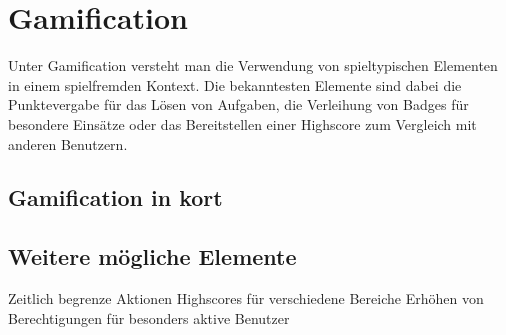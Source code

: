 \chapter{Gamification}
\label{gamification}

Unter Gamification versteht man die Verwendung von spieltypischen Elementen in einem spielfremden Kontext.
Die bekanntesten Elemente sind dabei die Punktevergabe für das Lösen von Aufgaben, die Verleihung von Badges für besondere Einsätze oder das Bereitstellen einer Highscore zum Vergleich mit anderen Benutzern.

\section{Gamification in kort}


\section{Weitere mögliche Elemente}

Zeitlich begrenze Aktionen
Highscores für verschiedene Bereiche
Erhöhen von Berechtigungen für besonders aktive Benutzer